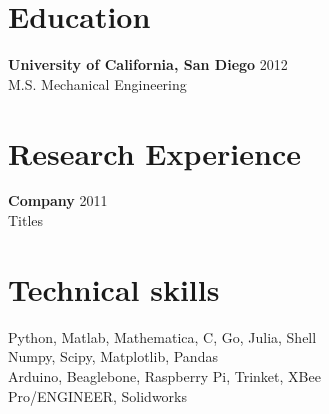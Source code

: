 \documentclass[line]{res}
\begin{document}
\address{9500 Gilman Drive, La Jolla, CA 92093--0411}

\begin{resume}

\section{Education}
\textbf{University of California, San Diego} \hfill 2012 \\
M.S. Mechanical Engineering


\section{Research Experience}
\textbf{Company} \hfill 2011 \\
Titles

\section{Technical skills}
Python, Matlab, Mathematica, C, Go, Julia, Shell \\
Numpy, Scipy, Matplotlib, Pandas \\
Arduino, Beaglebone, Raspberry Pi, Trinket, XBee \\
Pro/ENGINEER, Solidworks

\end{resume}
\end{document}
